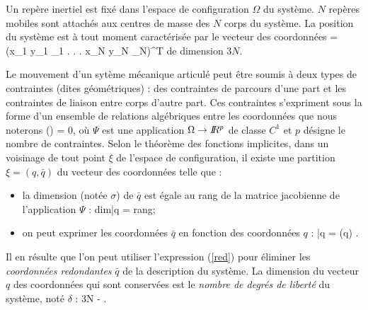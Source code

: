 \vspace{5mm}


Un repère inertiel est fixé dans l'espace de configuration $\Omega$ du sys\-tè\-me. $N$ 
repères mobiles sont attachés aux centres de masse des $N$ corps du système.
La position du système est à tout moment caractérisée par le vecteur des coordonnées 
\eqnn
\xi = (x_1 \; y_1 \; \theta_1 \; . \; . \; .\; x_N\; y_N\; \theta_N)^{T}
\eeqnn
de dimension $3N$.

\vspace{5mm}


Le mouvement d'un sytème mécanique articulé peut être soumis à deux types de 
contraintes (dites géométriques) : des contraintes de parcours d'une part et 
les contraintes de liaison entre corps d'autre part. 
Ces contraintes s'expriment sous la forme d'un ensemble de relations algébriques entre
les coordonnées que nous noterons 
\eqnn
\Psi (\xi) = 0,
\eeqnn
où $\Psi$ est une application $\Omega \rightarrow I \! \! R^p$ de classe $C^1$ et $p$
désigne le nombre de contraintes. Selon le théorème des fonctions implicites, dans un 
voisinage de tout point $\xi$
de l'espace de configuration, il existe une partition $\xi = (q, \bar{q})$ du vecteur des
coordonnées telle que :
\begin{itemize}
\item la dimension (notée $\sigma$) de $\bar{q}$ est égale au rang de la matrice 
jacobienne 
de l'application $\Psi$ :
\eqnn
\sigma \triangleq \mbox{dim}\bar{q} = \mbox{rang}\frac{\partial \Psi}{\partial \xi};
\eeqnn
\item on peut exprimer les coordonnées $\bar{q}$ en fonction des coordonnées $q$ :
\eqn
\bar{q} = \phi (q) \label{red}.
\eeqn
\end{itemize}
\noindent Il en résulte que l'on peut utiliser l'expression (\ref{red}) pour éliminer 
les {\em coordonnées redondantes} $\bar q$ de la description du système. La dimension 
du vecteur $q$ des coordonnées qui sont conservées est le {\em nombre de degrés de 
liberté} du système, noté $\delta$ :
\eqnn
\delta \triangleq 3N - \sigma.
\eeqnn

\vspace {5mm}



